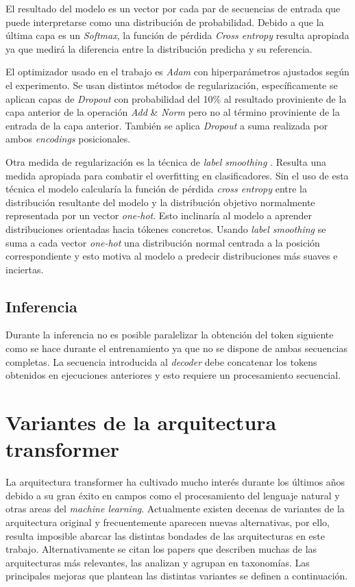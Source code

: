 El resultado del modelo es un vector por cada par de secuencias de entrada que puede interpretarse como una distribución de probabilidad. Debido a que la última capa es un \textit{Softmax}, la función de pérdida \textit{Cross entropy} resulta apropiada ya que medirá la diferencia entre la distribución predicha y su referencia.

El optimizador usado en el trabajo es \textit{Adam} \cite{Kingma2014Dec} con hiperparámetros ajustados según el experimento. Se usan distintos métodos de regularización, específicamente se aplican capas de \textit{Dropout} \cite{Srivastava2014} con probabilidad del 10\% al resultado proviniente de la capa anterior de la operación \textit{Add} \& \textit{Norm} pero no al término proviniente de la entrada de la capa anterior. También se aplica \textit{Dropout} a suma realizada por ambos \textit{encodings} posicionales.

Otra medida de regularización es la técnica de \textit{label smoothing} \cite{Szegedy2015Dec}. Resulta una medida apropiada para combatir el overfitting en clasificadores. Sin el uso de esta técnica el modelo calcularía la función de pérdida \textit{cross entropy} entre la distribución resultante del modelo y la distribución objetivo normalmente representada por un vector \textit{one-hot}. Esto inclinaría al modelo a aprender distribuciones orientadas hacia tókenes concretos. Usando \textit{label smoothing} se suma a cada vector \textit{one-hot} una distribución normal centrada a la posición correspondiente y esto motiva al modelo a predecir distribuciones más suaves e inciertas.

\subsection{Inferencia}
Durante la inferencia no es posible paralelizar la obtención del token siguiente como se hace durante el entrenamiento ya que no se dispone de ambas secuencias completas. La secuencia introducida al \textit{decoder} debe concatenar los tokens obtenidos en ejecuciones anteriores y esto requiere un procesamiento secuencial.

\section{Variantes de la arquitectura transformer} \label{transfvariants}
La arquitectura transformer ha cultivado mucho interés durante los últimos años debido a su gran éxito en campos como el procesamiento del lenguaje natural y otras areas del \textit{machine learning}. Actualmente existen decenas de variantes de la arquitectura original y frecuentemente aparecen nuevas alternativas, por ello, resulta imposible abarcar las distintas bondades de las arquitecturas en este trabajo. Alternativamente se citan los papers \cite{Tay2020Sep, Lin2021Jun} que describen muchas de las arquitecturas más relevantes, las analizan y agrupan en taxonomías. Las principales mejoras que plantean las distintas variantes se definen a continuación.

